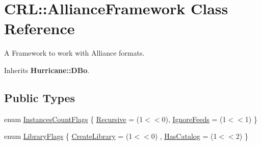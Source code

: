 \hypertarget{classCRL_1_1AllianceFramework}{}\section{C\+RL\+:\+:Alliance\+Framework Class Reference}
\label{classCRL_1_1AllianceFramework}


A Framework to work with Alliance formats.  




Inherits \textbf{ Hurricane\+::\+D\+Bo}.

\subsection*{Public Types}
\begin{DoxyCompactItemize}
\item 
enum \mbox{\hyperlink{classCRL_1_1AllianceFramework_a03ef94e043d2d25eb7a6a5f1ae176432}{Instances\+Count\+Flags}} \{ \newline
\mbox{\hyperlink{classCRL_1_1AllianceFramework_a03ef94e043d2d25eb7a6a5f1ae176432a3c65ebdaecc4b34b54a01ff3a5c3195a}{Recursive}} = (1$<$$<$0), 
\newline
\mbox{\hyperlink{classCRL_1_1AllianceFramework_a03ef94e043d2d25eb7a6a5f1ae176432a4a10630340ffb5b0aa9983f8b7f4cbe0}{Ignore\+Feeds}} = (1$<$$<$1)
 \}
\item 
enum \mbox{\hyperlink{classCRL_1_1AllianceFramework_a0ec1cd09dec34dfecfec22927b92cc25}{Library\+Flags}} \{ \newline
\mbox{\hyperlink{classCRL_1_1AllianceFramework_a0ec1cd09dec34dfecfec22927b92cc25ade58398b3ec849dc3aedb6a0812fbc7a}{Create\+Library}} = (1$<$$<$0)
, \newline
\mbox{\hyperlink{classCRL_1_1AllianceFramework_a0ec1cd09dec34dfecfec22927b92cc25a8d9678631764327cbfe81f8184fa9e05}{Has\+Catalog}} = (1$<$$<$2)
 \}
\end{DoxyCompactItemize}
